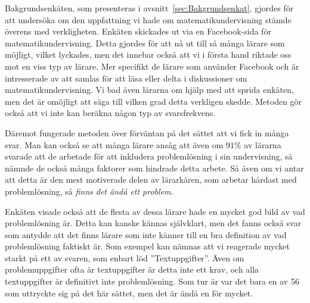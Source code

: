 \textcolor{lila}{Bakgrundsenkäten, som presenteras i avsnitt~\ref{sec:Bakgrundsenkat}, gjordes för att undersöka om den uppfattning vi hade om matematikundervisning stämde överens med verkligheten.} 
\textcolor{Mahogany}{Enkäten skickades ut via en Facebook-sida för matematikundervisning. Detta gjordes för att nå ut till så många lärare som möjligt, vilket lyckades, men det innebar också att vi i första hand riktade oss mot en viss typ av lärare.}
\textcolor{lila}{Mer specifikt de lärare som använder Facebook och är intresserade av att samlas för att läsa eller delta i diskussioner om matematikundervisning. Vi bad även lärarna om hjälp med att sprida enkäten, men det är omöjligt att säga till vilken grad detta verkligen skedde. Metoden gör också att vi inte kan beräkna någon typ av svarsfrekvens.}

\textcolor{lila}{Däremot fungerade metoden över förväntan på det sättet att vi fick in många svar. Man kan också se att många lärare ansåg att även om $91\%$ av lärarna svarade att de arbetade för att inkludera problemlösning i sin undervisning, så nämnde de också många faktorer som hindrade detta arbete. Så även om vi antar att detta är den mest motiverade delen av lärarkåren, som arbetar hårdast med problemlösning, så \textsl{finns det ändå ett problem}.}

\textcolor{lila}{Enkäten visade också att de flesta av dessa lärare hade en mycket god bild av vad problemlösning är. Detta kan kanske kännas självklart, men det fanns också svar som antydde att det finns lärare som inte känner till en bra definition av vad problemlösning faktiskt är. Som exempel kan nämnas att vi reagerade mycket starkt på ett av svaren, som enbart löd ''Textuppgifter''. Även om problemuppgifter ofta är textuppgifter är detta inte ett krav, och alla textuppgifter är definitivt inte problemlösning. Som tur är var det bara en av 56 som uttryckte sig på det här sättet, men det är ändå en för mycket.}


